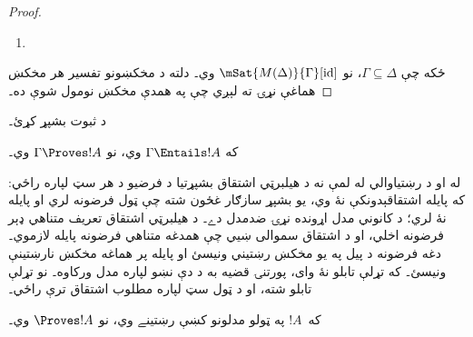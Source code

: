 \documentclass[../../../include/open-logic-section]{subfiles}
\begin{document}
\begin{proof}
\begin{enumerate}
{{      که $\sFmla{\False}{\indfrm}[\sigma] \in \Delta$ وي، نو د
      څانګې د بشپړتيا له مخې د کوم~$\sigma.n$ لپاره
      $\sFmla{\False}{!B}[\sigma.n] \in \Delta$ وي۔ د استقرا د
      فرضيې له مخې $\mSat/{M(\Delta)}{!B}[\sigma.n]$ وي۔
      ځکه چې $R\sigma(\sigma.n)$، داسې~$\sigma'$ شته چې
      $\mSat/{M(\Delta)}{!B}[\sigma']$ وي؛ نو
      $\mSat/{M(\Delta)}{\indfrm}[\sigma]$ وي۔}}
  \item {}
\end{enumerate}
ځکه چې $\Gamma \subseteq \Delta$، نو
$\mSat{M(\Delta)}{\Gamma}[\mathrm{id}]$ وي۔ دلته د مخکښونو
تفسير هر مخکښ هماغې نړۍ ته لېږي چې په همدې مخکښ نومول شوې ده۔
\end{proof}

\begin{prob}
د  ثبوت بشپړ کړئ۔
\end{prob}

\begin{cor}
که $\Gamma \Entails !A$ وي، نو $\Gamma \Proves !A$ وي۔
\end{cor}
له  او د
رښتياوالي له لمې نه د هيلبرټي اشتقاق بشپړتيا د فرضيو د هر سټ لپاره
راځي: که پايله اشتقاقېدونکې نۀ وي، يو بشپړ سازګار غځون شته چې ټول
فرضونه لري او پايله نۀ لري؛ د کانوني مدل اړونده نړۍ ضدمدل دے۔
د هيلبرټي اشتقاق تعريف متناهي ډېر فرضونه اخلي، او د اشتقاق سموالی
ښيي چې همدغه متناهي فرضونه پايله لازموي۔ دغه فرضونه د پيل په يو
مخکښ رښتيني ونيسئ او پايله پر هماغه مخکښ نارښتينې ونيسئ۔ که تړلې
تابلو نۀ وای، پورتنۍ قضيه به د دې نښو لپاره مدل ورکاوه۔ نو تړلې
تابلو شته، او د ټول سټ لپاره مطلوب اشتقاق ترې راځي۔

\begin{cor}
که~$!A$ په ټولو مدلونو کښې رښتينے وي، نو $\Proves !A$ وي۔
\end{cor}
\end{document}
